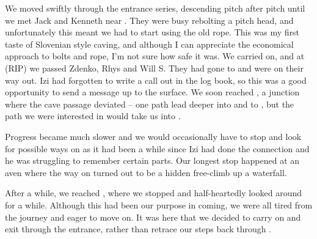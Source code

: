 We moved swiftly through the entrance series, descending pitch after pitch until we met Jack and Kenneth near . They were busy rebolting a pitch head, and unfortunately this meant we had to start using the old rope. This was my first taste of Slovenian style caving, and although I can appreciate the economical approach to bolts and rope, I'm not sure how safe it was. We carried on, and at  (RIP) we passed Zdenko, Rhys and Will S. They had gone to  and were on their way out. Izi had forgotten to write a call out in the log book, so this was a good opportunity to send a message up to the surface. We soon reached , a junction where the cave passage deviated -- one path lead deeper into  and to , but the path we were interested in would take us into . 

Progress became much slower and we would occasionally have to stop and look for possible ways on as it had been a while since Izi had done the connection and he was struggling to remember certain parts. Our longest stop happened at an aven where the way on turned out to be a hidden free-climb up a waterfall.

After a while, we reached , where we stopped and half-heartedly looked around for a while. Although this had been our purpose in coming, we were all tired from the journey and eager to move on. It was here that we decided to carry on and exit through the  entrance, rather than retrace our steps back through . 

